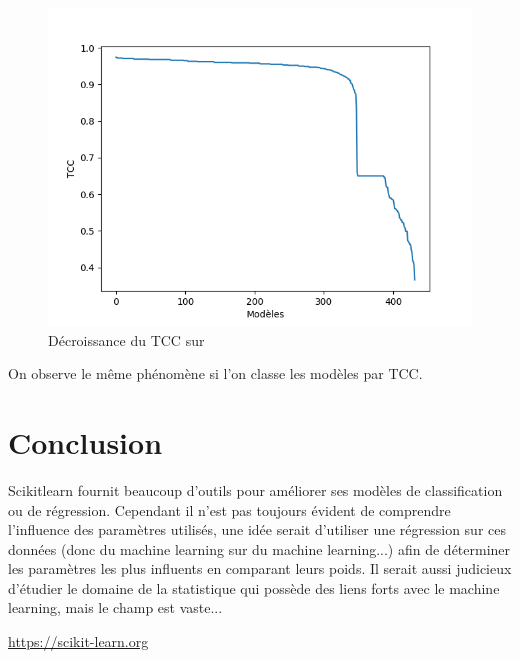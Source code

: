 \documentclass[10pt,letterpaper]{article}
\begin{document}
\begin{figure}[H]
\centering
\includegraphics[scale=0.65]{images/dj_pmc_2.png}
\caption{Décroissance du TCC sur\protect{}}
\end{figure}
On observe le même phénomène si l’on classe les modèles par TCC.
\section*{Conclusion}

Scikitlearn fournit beaucoup d’outils pour améliorer ses modèles de classification ou de régression. Cependant il n’est pas toujours évident de comprendre l’influence des paramètres utilisés, une idée serait d’utiliser une régression sur ces données (donc du machine learning sur du machine learning...) afin de déterminer les paramètres les plus influents en comparant leurs poids. Il serait aussi judicieux d’étudier le domaine de la statistique qui possède des liens forts avec le machine learning, mais le champ est vaste...

%
%
% 
\vspace{15mm}
\begin{thebibliography}{10}

\url{https://scikit-learn.org}

\end{thebibliography}
\end{document}
